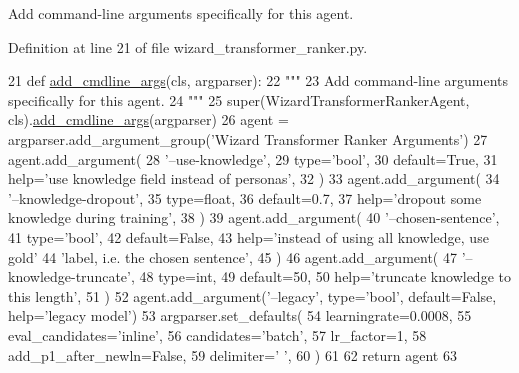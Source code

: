 \begin{DoxyVerb}Add command-line arguments specifically for this agent.
\end{DoxyVerb}
 

Definition at line 21 of file wizard\+\_\+transformer\+\_\+ranker.\+py.


\begin{DoxyCode}
21     \textcolor{keyword}{def }\hyperlink{namespaceparlai_1_1agents_1_1drqa_1_1config_a62fdd5554f1da6be0cba185271058320}{add\_cmdline\_args}(cls, argparser):
22         \textcolor{stringliteral}{"""}
23 \textcolor{stringliteral}{        Add command-line arguments specifically for this agent.}
24 \textcolor{stringliteral}{        """}
25         super(WizardTransformerRankerAgent, cls).\hyperlink{namespaceparlai_1_1agents_1_1drqa_1_1config_a62fdd5554f1da6be0cba185271058320}{add\_cmdline\_args}(argparser)
26         agent = argparser.add\_argument\_group(\textcolor{stringliteral}{'Wizard Transformer Ranker Arguments'})
27         agent.add\_argument(
28             \textcolor{stringliteral}{'--use-knowledge'},
29             type=\textcolor{stringliteral}{'bool'},
30             default=\textcolor{keyword}{True},
31             help=\textcolor{stringliteral}{'use knowledge field instead of personas'},
32         )
33         agent.add\_argument(
34             \textcolor{stringliteral}{'--knowledge-dropout'},
35             type=float,
36             default=0.7,
37             help=\textcolor{stringliteral}{'dropout some knowledge during training'},
38         )
39         agent.add\_argument(
40             \textcolor{stringliteral}{'--chosen-sentence'},
41             type=\textcolor{stringliteral}{'bool'},
42             default=\textcolor{keyword}{False},
43             help=\textcolor{stringliteral}{'instead of using all knowledge, use gold'}
44             \textcolor{stringliteral}{'label, i.e. the chosen sentence'},
45         )
46         agent.add\_argument(
47             \textcolor{stringliteral}{'--knowledge-truncate'},
48             type=int,
49             default=50,
50             help=\textcolor{stringliteral}{'truncate knowledge to this length'},
51         )
52         agent.add\_argument(\textcolor{stringliteral}{'--legacy'}, type=\textcolor{stringliteral}{'bool'}, default=\textcolor{keyword}{False}, help=\textcolor{stringliteral}{'legacy model'})
53         argparser.set\_defaults(
54             learningrate=0.0008,
55             eval\_candidates=\textcolor{stringliteral}{'inline'},
56             candidates=\textcolor{stringliteral}{'batch'},
57             lr\_factor=1,
58             add\_p1\_after\_newln=\textcolor{keyword}{False},
59             delimiter=\textcolor{stringliteral}{' '},
60         )
61 
62         \textcolor{keywordflow}{return} agent
63 
\end{DoxyCode}
